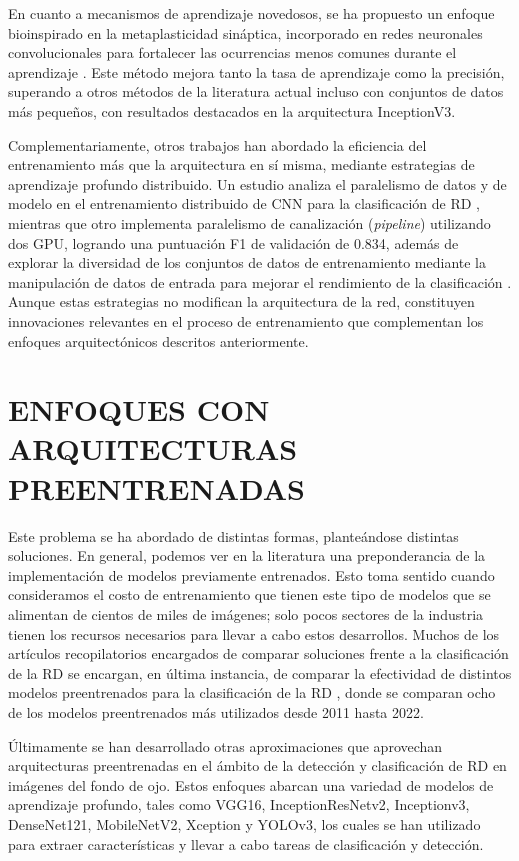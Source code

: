 En cuanto a mecanismos de aprendizaje novedosos, se ha propuesto un enfoque bioinspirado
en la metaplasticidad sináptica, incorporado en redes neuronales convolucionales para
fortalecer las ocurrencias menos comunes durante el aprendizaje
. Este método mejora tanto la tasa de aprendizaje como la
precisión, superando a otros métodos de la literatura actual incluso con conjuntos de
datos más pequeños, con resultados destacados en la arquitectura InceptionV3.

Complementariamente, otros trabajos han abordado la eficiencia del entrenamiento más que
la arquitectura en sí misma, mediante estrategias de aprendizaje profundo distribuido. Un
estudio analiza el paralelismo de datos y de modelo en el entrenamiento distribuido de CNN
para la clasificación de RD , mientras que otro implementa
paralelismo de canalización (\textit{pipeline}) utilizando dos GPU, logrando una
puntuación F1 de validación de 0.834, además de explorar la diversidad de los conjuntos de
datos de entrenamiento mediante la manipulación de datos de entrada para mejorar el
rendimiento de la clasificación . Aunque estas estrategias
no modifican la arquitectura de la red, constituyen innovaciones relevantes en el proceso
de entrenamiento que complementan los enfoques arquitectónicos descritos anteriormente.

\section{ENFOQUES CON ARQUITECTURAS PREENTRENADAS}

Este problema se ha abordado de distintas formas, planteándose distintas soluciones. En
general, podemos ver en la literatura una preponderancia de la implementación de modelos
previamente entrenados. Esto toma sentido cuando consideramos el costo de entrenamiento
que tienen este tipo de modelos que se alimentan de cientos de miles de imágenes; solo
pocos sectores de la industria tienen los recursos necesarios para llevar a cabo estos
desarrollos. Muchos de los artículos recopilatorios encargados de comparar soluciones
frente a la clasificación de la RD se encargan, en última instancia, de comparar la
efectividad de distintos modelos preentrenados para la clasificación de la RD
, donde se comparan ocho de los modelos preentrenados más
utilizados desde 2011 hasta 2022.

Últimamente se han desarrollado otras aproximaciones que aprovechan arquitecturas
preentrenadas en el ámbito de la detección y clasificación de RD
en imágenes del fondo de ojo. Estos enfoques abarcan una variedad de modelos de
aprendizaje profundo, tales como VGG16, InceptionResNetv2, Inceptionv3, DenseNet121,
MobileNetV2, Xception y YOLOv3, los cuales se han utilizado para extraer características
y llevar a cabo tareas de clasificación y detección.

